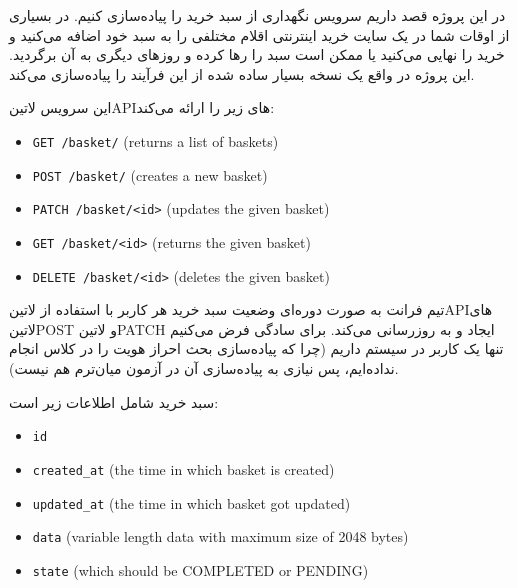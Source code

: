 
در این پروژه قصد داریم سرویس نگهداری از سبد خرید را پیاده‌سازی کنیم. در بسیاری از اوقات شما در یک سایت خرید
اینترنتی اقلام مختلفی را به سبد خود اضافه می‌کنید و خرید را نهایی می‌کنید یا ممکن است سبد را رها کرده و روزهای دیگری
به آن برگردید. این پروژه در واقع یک نسخه بسیار ساده شده از این فرآیند را پیاده‌سازی می‌کند.


این سرویس ‌لاتین{API}های زیر را ارائه می‌کند:


\begin{latin}
  \begin{itemize}
    \item \verb|GET /basket/| (returns a list of baskets)
    \item \verb|POST /basket/| (creates a new basket)
    \item \verb|PATCH /basket/<id>| (updates the given basket)
    \item \verb|GET /basket/<id>| (returns the given basket)
    \item \verb|DELETE /basket/<id>| (deletes the given basket)
  \end{itemize}
\end{latin}

تیم فرانت به صورت دوره‌ای وضعیت سبد خرید هر کاربر با استفاده از ‌لاتین{API}های ‌لاتین{POST} و ‌لاتین{PATCH} ایجاد و به روزرسانی می‌کند.
برای سادگی فرض می‌کنیم تنها یک کاربر در سیستم داریم (چرا که پیاده‌سازی بحث احراز هویت را در کلاس انجام نداده‌ایم، پس نیازی به پیاده‌سازی آن در آزمون میان‌ترم هم نیست).



سبد خرید شامل اطلاعات زیر است:

\begin{latin}
  \begin{itemize}
    \item \verb|id|
    \item \verb|created_at| (the time in which basket is created)
    \item \verb|updated_at| (the time in which basket got updated)
    \item \verb|data| (variable length data with maximum size of 2048 bytes)
    \item \verb|state| (which should be COMPLETED or PENDING)
  \end{itemize}
\end{latin}

